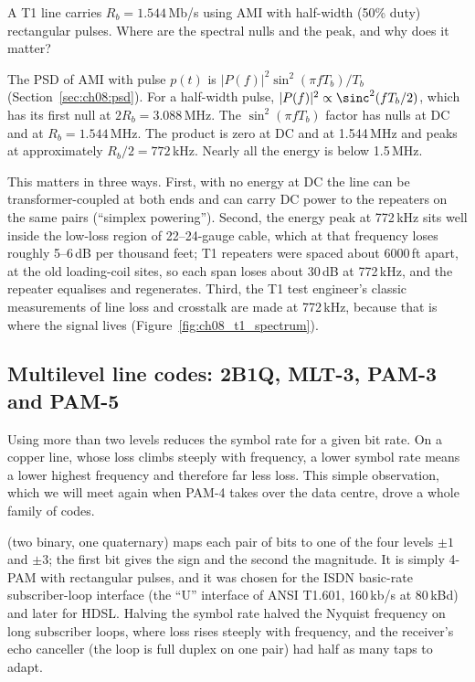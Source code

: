 \begin{worked}
A T1 line carries $R_b=1.544$\,Mb/s using AMI with half-width (50\% duty) rectangular pulses.
Where are the spectral nulls and the peak, and why does it matter?

The PSD of AMI with pulse $p(t)$ is $|P(f)|^2\sin^2(\pi fT_b)/T_b$
(Section~\ref{sec:ch08:psd}). For a half-width pulse, $|P(f)|^2\propto\sinc^2(fT_b/2)$, which
has its first null at $2R_b=3.088$\,MHz. The $\sin^2(\pi fT_b)$ factor has nulls at DC and at
$R_b=1.544$\,MHz. The product is zero at DC and at 1.544\,MHz and peaks at approximately
$R_b/2=772$\,kHz. Nearly all the energy is below 1.5\,MHz.

This matters in three ways. First, with no energy at DC the line can be transformer-coupled
at both ends and can carry DC power to the repeaters on the same pairs (``simplex
powering''). Second, the energy peak at 772\,kHz sits well inside the low-loss region of
22--24-gauge cable, which at that frequency loses roughly 5--6\,dB per thousand feet; T1
repeaters were spaced about 6000\,ft apart, at the old loading-coil sites, so each span loses
about 30\,dB at 772\,kHz, and the repeater equalises and regenerates. Third, the T1 test
engineer's classic measurements of line loss and crosstalk are made at 772\,kHz, because that
is where the signal lives (Figure~\ref{fig:ch08_t1_spectrum}).
\end{worked}


\subsection{Multilevel line codes: 2B1Q, MLT-3, PAM-3 and PAM-5}

Using more than two levels reduces the symbol rate for a given bit rate. On a copper line,
whose loss climbs steeply with frequency, a lower symbol rate means a lower highest frequency
and therefore far less loss. This simple observation, which we will meet again when PAM-4
takes over the data centre, drove a whole family of codes.

 (two binary, one quaternary) maps each pair of bits to one of the four levels
$\pm1$ and $\pm3$; the first bit gives the sign and the second the magnitude. It is simply
4-PAM with rectangular pulses, and it was chosen for the ISDN basic-rate subscriber-loop
interface (the ``U'' interface of ANSI T1.601, 160\,kb/s at 80\,kBd) and later for HDSL.
Halving the symbol rate halved the Nyquist frequency on long subscriber loops, where loss rises
steeply with frequency, and the receiver's echo canceller (the loop is full duplex on one pair)
had half as many taps to adapt.

